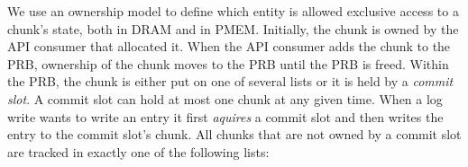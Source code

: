 \documentclass[12pt,a4paper,twoside]{book}
\begin{document}
We use an ownership model to define which entity is allowed exclusive access to a chunk's state, both in DRAM and in PMEM.
Initially, the chunk is owned by the API consumer that allocated it.
When the API consumer adds the chunk to the PRB, ownership of the chunk moves to the PRB until the PRB is freed.
Within the PRB, the chunk is either put on one of several lists or it is held by a \textit{commit slot}.
A commit slot can hold at most one chunk at any given time.
When a log write wants to write an entry it first \textit{aquires} a commit slot and then writes the entry to the commit slot's chunk.
All chunks that are not owned by a commit slot are tracked in exactly one of the following lists:
\end{document}
